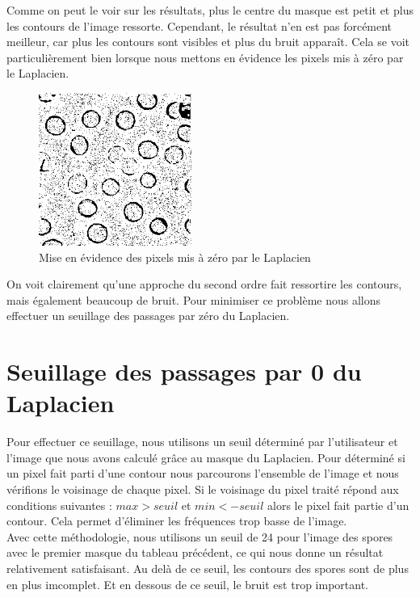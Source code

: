 \documentclass[a4paper,11pt]{article}
\begin{document}
  Comme on peut le voir sur les résultats, plus le centre du masque est petit et plus les contours de l'image ressorte. 
  Cependant, le résultat n'en est pas forcément meilleur, car plus les contours sont visibles et plus du bruit apparaît.
  Cela se voit particulièrement bien lorsque nous mettons en évidence les pixels mis à zéro par le Laplacien.
  
  \begin{figure}[H]
   \center
   \includegraphics[width=5cm]{../laplacien0.png}
   \caption{Mise en évidence des pixels mis à zéro par le Laplacien}
  \end{figure}

  On voit clairement qu'une approche du second ordre fait ressortire les contours, mais également beaucoup de bruit. 
  Pour minimiser ce problème nous allons effectuer un seuillage des passages par zéro du Laplacien.
  
  \section{Seuillage des passages par 0 du Laplacien}
  Pour effectuer ce seuillage, nous utilisons un seuil déterminé par l'utilisateur et l'image que nous avons
  calculé grâce au masque du Laplacien. Pour déterminé si un pixel fait parti d'une contour nous parcourons l'ensemble de l'image 
  et nous vérifions le voisinage de chaque pixel. Si le voisinage du pixel traité répond aux conditions suivantes : $max > seuil$ et $min < -seuil$
  alors le pixel fait partie d'un contour. Cela permet d'éliminer les fréquences trop basse de l'image.\\ 
  
  Avec cette méthodologie, nous utilisons un seuil de 24 pour l'image des spores avec le premier masque du tableau précédent, ce qui nous donne un résultat relativement
  satisfaisant. Au delà de ce seuil, les contours des spores sont de plus en plus imcomplet. Et en dessous de ce seuil, le bruit est
  trop important.
  
\end{document}
